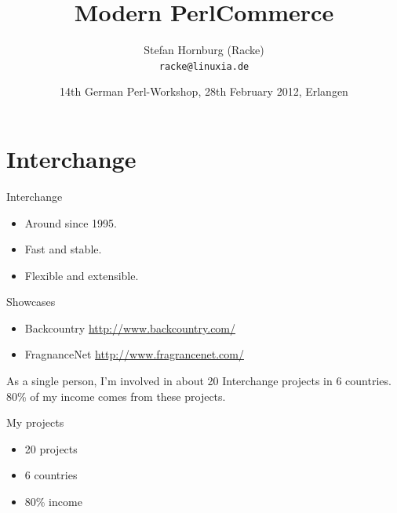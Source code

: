 
\usepackage[T1]{fontenc}
\usepackage{mathptmx}
\usepackage[scaled=.90]{helvet}
\usepackage{courier}

\usepackage{beamerthemesplit}
\usepackage{verbatim}
\usepackage{hyperref}
\usepackage{listings}
\lstset{language=Perl,basicstyle=\footnotesize,tabsize=3,showstringspaces=false}


\title{Modern PerlCommerce}
\author[racke]{Stefan Hornburg (Racke)\\ \texttt{racke@linuxia.de}}
\date[]{14th German Perl-Workshop, 28th February 2012, Erlangen}


\maketitle{}

\begin{frame}
  \titlepage
\end{frame}

\tableofcontents

\section{Interchange}

\begin{frame}{Interchange}
\begin{itemize}
\item Around since 1995.
\item Fast and stable.
\item Flexible and extensible.
\end{itemize}
\end{frame}

\begin{frame}{Showcases}
\begin{itemize}
\item Backcountry \url{http://www.backcountry.com/}
\item FragnanceNet \url{http://www.fragrancenet.com/}
\end{itemize}
\end{frame}

As a single person, I'm involved in about 20 Interchange
projects in 6 countries. 80\% of my income comes from
these projects.

\begin{frame}{My projects}
\begin{itemize}
\item 20 projects
\item 6 countries
\item 80\% income
\end{itemize}
\end{frame}

